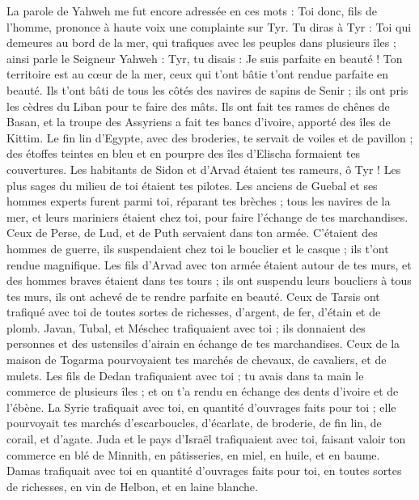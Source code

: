 \begin{multicols}{2}
\VerseOne{}La parole de Yahweh me fut encore adressée en ces mots :
Toi donc, fils de l’homme, prononce à haute voix une complainte sur Tyr.
Tu diras à Tyr : Toi qui demeures au bord de la mer, qui trafiques avec les peuples dans plusieurs îles ; ainsi parle le Seigneur Yahweh : Tyr, tu disais : Je suis parfaite en beauté !
Ton territoire est au cœur de la mer, ceux qui t'ont bâtie t'ont rendue parfaite en beauté.
Ils t'ont bâti de tous les côtés des navires de sapins de Senir ; ils ont pris les cèdres du Liban pour te faire des mâts.
Ils ont fait tes rames de chênes de Basan, et la troupe des Assyriens a fait tes bancs d'ivoire, apporté des îles de Kittim.
Le fin lin d'Egypte, avec des broderies, te servait de voiles et de pavillon ; des étoffes teintes en bleu et en pourpre des îles d’Elischa formaient tes couvertures.
Les habitants de Sidon et d'Arvad étaient tes rameurs, ô Tyr ! Les plus sages du milieu de toi étaient tes pilotes.
Les anciens de Guebal et ses hommes experts furent parmi toi, réparant tes brèches ; tous les navires de la mer, et leurs mariniers étaient chez toi, pour faire l’échange de tes marchandises.
Ceux de Perse, de Lud, et de Puth servaient dans ton armée. C’étaient des hommes de guerre, ils suspendaient chez toi le bouclier et le casque ; ils t'ont rendue magnifique.
Les fils d'Arvad avec ton armée étaient autour de tes murs, et des hommes braves étaient dans tes tours ; ils ont suspendu leurs boucliers à tous tes murs, ils ont achevé de te rendre parfaite en beauté.
Ceux de Tarsis ont trafiqué avec toi de toutes sortes de richesses, d’argent, de fer, d’étain et de plomb.
Javan, Tubal, et Méschec trafiquaient avec toi ; ils donnaient des personnes et des ustensiles d’airain en échange de tes marchandises.
Ceux de la maison de Togarma pourvoyaient tes marchés de chevaux, de cavaliers, et de mulets.
Les fils de Dedan trafiquaient avec toi ; tu avais dans ta main le commerce de plusieurs îles ; et on t'a rendu en échange des dents d'ivoire et de l'ébène.
La Syrie trafiquait avec toi, en quantité d'ouvrages faits pour toi ; elle pourvoyait tes marchés d’escarboucles, d’écarlate, de broderie, de fin lin, de corail, et d’agate.
Juda et le pays d'Israël trafiquaient avec toi, faisant valoir ton commerce en blé de Minnith, en pâtisseries, en miel, en huile, et en baume.
Damas trafiquait avec toi en quantité d'ouvrages faits pour toi, en toutes sortes de richesses, en vin de Helbon, et en laine blanche.

\end{multicols}
